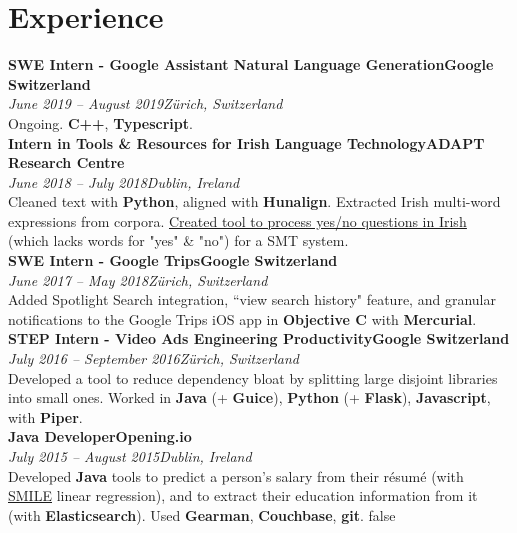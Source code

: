 \documentclass[a4paper, oneside, final]{scrartcl}
\newcommand{\nasc}[2]{\href{#1}{\color{blue}\setulcolor{blue}\ul{#2}}}
\newcommand{\bearna}[0]{\vspace{2.25mm}\\}
\newcommand{\fmtdate}[1]{\textit{#1}}
\newcommand{\fmtaddress}[1]{\textit{#1}}
\newcommand{\fmtjobtitle}[1]{\textbf{#1}}
\newcommand{\fmtskill}[1]{\textbf{#1}}
\begin{document}
\section{Experience}
\fmtjobtitle{SWE Intern - Google Assistant Natural Language Generation\hfill Google Switzerland}\\
\fmtdate{June 2019 -- August 2019}\hfill\fmtaddress{Zürich, Switzerland}\\
Ongoing. \fmtskill{C++}, \fmtskill{Typescript}.
\bearna
\fmtjobtitle{Intern in Tools \& Resources for Irish Language Technology\hfill ADAPT Research Centre}\\
\fmtdate{June 2018 -- July 2018}\hfill\fmtaddress{Dublin, Ireland}\\
Cleaned text with \fmtskill{Python}, aligned with \fmtskill{Hunalign}. Extracted Irish multi-word expressions from corpora. \nasc{http://mycode.doesnot.run/2018/08/15/yes-no/}{Created tool to process yes/no questions in Irish} (which lacks words for "yes" \& "no") for a SMT system.
\bearna
\fmtjobtitle{SWE Intern - Google Trips\hfill Google Switzerland}\\
\fmtdate{June 2017 -- May 2018}\hfill\fmtaddress{Zürich, Switzerland}\\
Added Spotlight Search integration, ``view search history" feature, and granular notifications to the Google Trips iOS app in \fmtskill{Objective C} with \fmtskill{Mercurial}.
\bearna
\fmtjobtitle{STEP Intern - Video Ads Engineering Productivity\hfill Google Switzerland}\\
\fmtdate{July 2016 -- September 2016}\hfill\fmtaddress{Zürich, Switzerland}\\
Developed a tool to reduce dependency bloat by splitting large disjoint libraries into small ones. Worked in \fmtskill{Java} (+ \fmtskill{Guice}), \fmtskill{Python} (+ \fmtskill{Flask}), \fmtskill{Javascript}, with \fmtskill{Piper}.
\bearna
\fmtjobtitle{Java Developer\hfill Opening.io}\\
\fmtdate{July 2015 -- August 2015}\hfill\fmtaddress{Dublin, Ireland}\\
Developed \fmtskill{Java} tools to predict a person's salary from their résumé (with \nasc{https://github.com/haifengl/smile}{SMILE} linear regression), and to extract their education information from it (with \fmtskill{Elasticsearch}). Used \fmtskill{Gearman}, \fmtskill{Couchbase}, \fmtskill{git}.
\if false
\bearna
{}
\end{document}

